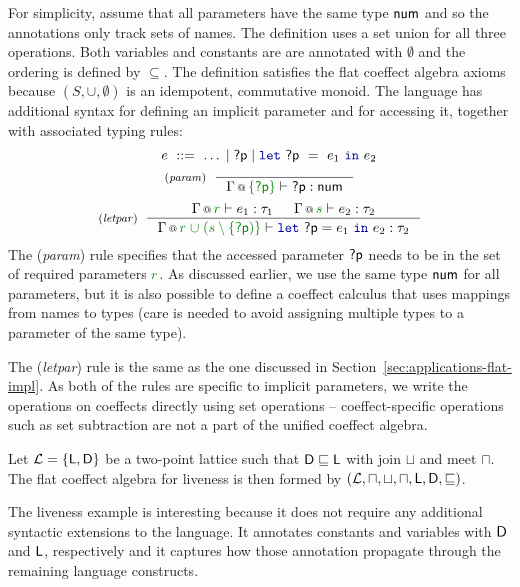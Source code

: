 \noindent
For simplicity, assume that all parameters have the same type $\textnormal{\sffamily num}$ and so the annotations only
track sets of names. The definition uses a set union for all three operations. Both variables and
constants are are annotated with $\emptyset$ and the ordering is defined by $\subseteq$. The
definition satisfies the flat coeffect algebra axioms because $(S, \cup, \emptyset)$ is an idempotent,
commutative monoid. The language has additional syntax for defining an implicit parameter and for
accessing it, together with associated typing rules:
%
\begin{equation*}
\quad~ e ~::=~ \ldots \sep \ident{?p} \sep \kvd{let}~\ident{?p}~=~e_1~\kvd{in}~e_2
\end{equation*}
\begin{equation*}
\tyrule{param}
  { ~ }
  { \coctx{\Gamma}{\cclrd{ \{ \ident{?p} \} }} \vdash \ident{?p} : \ident{num} }
\end{equation*}
\begin{equation*}
\tyrule{letpar}
  { \coctx{\Gamma}{\cclrd{r}} \vdash e_1 : \tau_1 &
    \coctx{\Gamma}{\cclrd{s}} \vdash e_2 : \tau_2}
  {\coctx{\Gamma}{\cclrd{r} \;\cclrd{\cup\; (\cclrd{s} \setminus \{ \ident{?p}) \}} } \vdash \kvd{let}~\ident{?p}=e_1~\kvd{in}~e_2 : \tau_2 }
\end{equation*}
%
The (\emph{param}) rule specifies that the accessed parameter $\textnormal{\sffamily ?p}$ needs to be in the set of
required parameters $\cclrd{r}$. As discussed earlier, we use the same type $\textnormal{\sffamily num}$ for all
parameters, but it is also possible to define a coeffect calculus that uses mappings from names to
types (care is needed to avoid assigning multiple types to a parameter of the same type).

The (\emph{letpar}) rule is the same as the one discussed in Section~\ref{sec:applications-flat-impl}.
As both of the rules are specific to implicit parameters, we write the operations on coeffects directly
using set operations -- coeffect-specific operations such as set subtraction are not a part of the
unified coeffect algebra.

\begin{example}[Liveness]
Let $\mathcal{L}=\{ \ident{L}, \ident{D} \}$ be a two-point lattice such that $\textnormal{\sffamily D} \sqsubseteq \textnormal{\sffamily L}$
with join $\sqcup$ and meet $\sqcap$. The flat coeffect algebra for liveness is then formed by
$(\mathcal{L}, \sqcap, \sqcup, \sqcap, \textnormal{\sffamily L}, \textnormal{\sffamily D}, \sqsubseteq)$.
\end{example}

\noindent
The liveness example is interesting because it does not require any additional syntactic extensions
to the language. It annotates constants and variables with $\textnormal{\sffamily D}$ and $\textnormal{\sffamily L}$, respectively
and it captures how those annotation propagate through the remaining language constructs.

